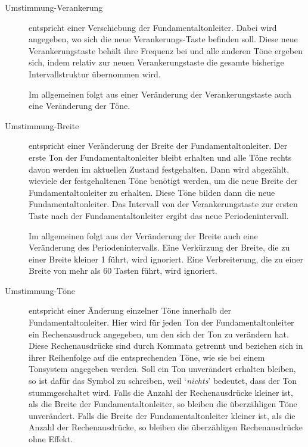 \begin{description}
  \item[Umstimmung-Verankerung]
      entspricht einer Verschiebung
      der Fundamentaltonleiter. Dabei wird angegeben, wo sich die
      neue Verankerungs-Taste befinden soll. Diese neue Verankerungstaste
      behält ihre Frequenz bei und alle anderen Töne ergeben sich,
      indem relativ zur neuen Verankerungstaste die gesamte
      bisherige Intervallstruktur
      übernommen wird.

      Im allgemeinen folgt aus einer Veränderung der Verankerungstaste auch
      eine Veränderung der Töne.

      

      

  \item[Umstimmung-Breite]
      entspricht einer Veränderung der Breite
      der Fundamentaltonleiter.
      Der erste Ton der Fundamentaltonleiter bleibt erhalten und alle
      Töne rechts davon werden im aktuellen Zustand festgehalten.
      Dann wird abgezählt, wieviele der festgehaltenen Töne benötigt
      werden, um die neue Breite der Fundamentaltonleiter zu erhalten.
      Diese Töne bilden dann die neue Fundamentaltonleiter.
      Das Intervall von der Verankerungstaste zur ersten Taste nach der
      Fundamentaltonleiter ergibt das neue Periodenintervall.

      Im allgemeinen folgt aus der Veränderung der Breite auch eine Veränderung
      des Periodenintervalls. Eine Verkürzung der Breite, die zu einer
      Breite kleiner 1 führt, wird ignoriert. Eine Verbreiterung, die
      zu einer Breite von mehr als 60 Tasten führt, wird ignoriert.

      


  \item[Umstimmung-Töne]
      entspricht einer Änderung einzelner Töne
      innerhalb der Fundamentaltonleiter.
      Hier wird für jeden Ton der Fundamentaltonleiter ein Rechenausdruck
      angegeben, um den sich der Ton zu verändern hat. Diese Rechenausdrücke
      sind durch Kommata getrennt und beziehen sich in ihrer Reihenfolge
      auf die entsprechenden Töne, wie sie bei einem Tonsystem
      angegeben werden.
      Soll ein Ton unverändert
      erhalten bleiben, so ist dafür das Symbol 
      zu schreiben, weil
      `\emph{nichts}' bedeutet, dass der Ton stummgeschaltet wird.
      Falls die Anzahl der Rechenausdrücke kleiner ist, als die
      Breite der Fundamentaltonleiter, so bleiben die überzähligen Töne
      unverändert. Falls die Breite der Fundamentaltonleiter kleiner ist,
      als die Anzahl der Rechenausdrücke, so bleiben die
      überzähligen Rechenausdrücke ohne Effekt.


\end{description}
